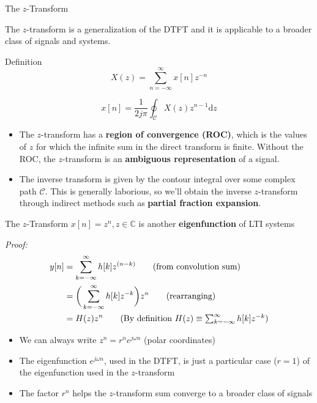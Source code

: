 \documentclass[10pt, handout]{beamer}
\begin{document}
\begin{frame}{The $z$-Transform}

The $z$-transform is a generalization of the DTFT and it is applicable to a broader class of signals and systems.

\begin{block}{Definition}
	\begin{equation} \tag{Direct transform}
	X(z) = \sum_{n=-\infty}^{\infty} x[n]z^{-n} 
	\end{equation}
	
	\begin{equation}\tag{Inverse transform}
	x[n] = \frac{1}{2j\pi}\oint_{\mathcal{C}}X(z)z^{n-1}\mathrm{d}z
	\end{equation}
\end{block}

\begin{itemize}
	\item The $z$-transform has a \textbf{region of convergence (ROC)}, which is the values of $z$ for which the infinite sum in the direct transform is finite. Without the ROC, the $z$-transform is an \textbf{ambiguous representation} of a signal.
	\item The inverse transform is given by the contour integral over some complex path $\mathcal{C}$. This is generally laborious, so we'll obtain the inverse $z$-transform through indirect methods such as \textbf{partial fraction expansion}.
\end{itemize}
\end{frame}

%
\begin{frame}{The $z$-Transform}
$x[n] = z^n, z\in\mathbb{C}$ is another \textbf{eigenfunction} of LTI systems

\textit{Proof:}
\begin{align*}
y[n] &= \sum_{k=-\infty}^{\infty} h[k]z^{(n-k)} \tag{from convolution sum} \\
&= \bigg(\sum_{k=-\infty}^{\infty} h[k]z^{-k}\bigg)z^{n} \tag{rearranging}\\
&= H(z)z^{n} \tag{By definition $H(z) \equiv \sum_{k=-\infty}^{\infty} h[k]z^{-k}$}
\end{align*}	

\begin{itemize}
	\item We can always write $z^n = r^ne^{j\omega n}$ (polar coordinates)
	\item The eigenfunction $e^{j\omega n}$, used in the DTFT, is just a particular case ($r=1$) of the eigenfunction used in the $z$-transform
	\item The factor $r^n$ helps the $z$-transform sum converge to a broader class of signals
\end{itemize}

\end{frame}
\end{document}
